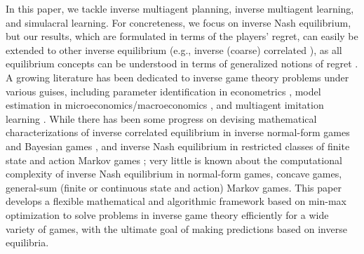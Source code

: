 


In this paper, we tackle inverse multiagent planning, inverse multiagent learning, and simulacral learning. 
For concreteness, we focus on inverse Nash equilibrium, but our results, which are formulated in terms of the players' regret, can easily be extended to other inverse equilibrium (e.g., inverse (coarse) correlated \citep{kuleshov2015inverse}), as all equilibrium concepts can be understood in terms of generalized notions of regret \citep{greenwald2003general}. 
A growing literature has been dedicated to inverse game theory problems under various guises, including parameter identification in econometrics \citep{wright1928tariff, syrgkanis2017inference}, model estimation in microeconomics/macroeconomics \citep{taylor1979estimation}, and multiagent imitation learning \citep{song2018multi}.
While there has been some progress on devising mathematical characterizations of inverse correlated equilibrium in 
inverse  normal-form games \citep{waugh2013computational, kuleshov2015inverse} and Bayesian games \citep{syrgkanis2017inference}, and inverse Nash equilibrium in restricted classes of finite state and action Markov games \citep{lin2017multiagent, lin2019multi}; very little is known about the computational complexity of inverse Nash equilibrium in  normal-form games, concave games, general-sum (finite or continuous state and action) Markov games.
This paper develops a flexible mathematical and algorithmic framework based on min-max optimization to solve problems in inverse game theory efficiently for a wide variety of games, with the ultimate goal of making predictions based on inverse equilibria.
\fi



